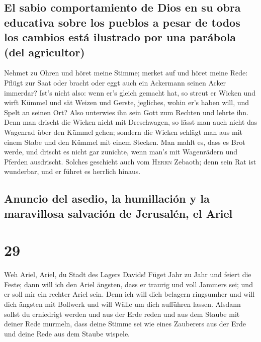 \hypertarget{el-sabio-comportamiento-de-dios-en-su-obra-educativa-sobre-los-pueblos-a-pesar-de-todos-los-cambios-estuxe1-ilustrado-por-una-paruxe1bola-del-agricultor}{%
\subsection{El sabio comportamiento de Dios en su obra educativa sobre
los pueblos a pesar de todos los cambios está ilustrado por una parábola
(del
agricultor)}\label{el-sabio-comportamiento-de-dios-en-su-obra-educativa-sobre-los-pueblos-a-pesar-de-todos-los-cambios-estuxe1-ilustrado-por-una-paruxe1bola-del-agricultor}}

 Nehmet zu Ohren und höret meine Stimme; merket auf und
höret meine Rede:  Pflügt zur Saat oder bracht oder eggt
auch ein Ackermann seinen Acker immerdar?  Ist's nicht
also: wenn er's gleich gemacht hat, so streut er Wicken und wirft Kümmel
und sät Weizen und Gerste, jegliches, wohin er's haben will, und Spelt
an seinen Ort?  Also unterwies ihn sein Gott zum Rechten
und lehrte ihn.  Denn man drischt die Wicken nicht mit
Dreschwagen, so lässt man auch nicht das Wagenrad über den Kümmel gehen;
sondern die Wicken schlägt man aus mit einem Stabe und den Kümmel mit
einem Stecken.  Man mahlt es, dass es Brot werde, und
drischt es nicht gar zunichte, wenn man's mit Wagenrädern und Pferden
ausdrischt.  Solches geschieht auch vom \textsc{Herrn}
Zebaoth; denn sein Rat ist wunderbar, und er führet es herrlich hinaus.

\hypertarget{anuncio-del-asedio-la-humillaciuxf3n-y-la-maravillosa-salvaciuxf3n-de-jerusaluxe9n-el-ariel}{%
\subsection{Anuncio del asedio, la humillación y la maravillosa
salvación de Jerusalén, el
Ariel}\label{anuncio-del-asedio-la-humillaciuxf3n-y-la-maravillosa-salvaciuxf3n-de-jerusaluxe9n-el-ariel}}

\hypertarget{section-28}{%
\section{29}\label{section-28}}

 Weh Ariel, Ariel, du Stadt des Lagers Davids! Füget Jahr
zu Jahr und feiert die Feste;  dann will ich den Ariel
ängsten, dass er traurig und voll Jammers sei; und er soll mir ein
rechter Ariel sein.  Denn ich will dich belagern
ringsumher und will dich ängsten mit Bollwerk und will Wälle um dich
aufführen lassen.  Alsdann sollst du erniedrigt werden und
aus der Erde reden und aus dem Staube mit deiner Rede murmeln, dass
deine Stimme sei wie eines Zauberers aus der Erde und deine Rede aus dem
Staube wispele.

